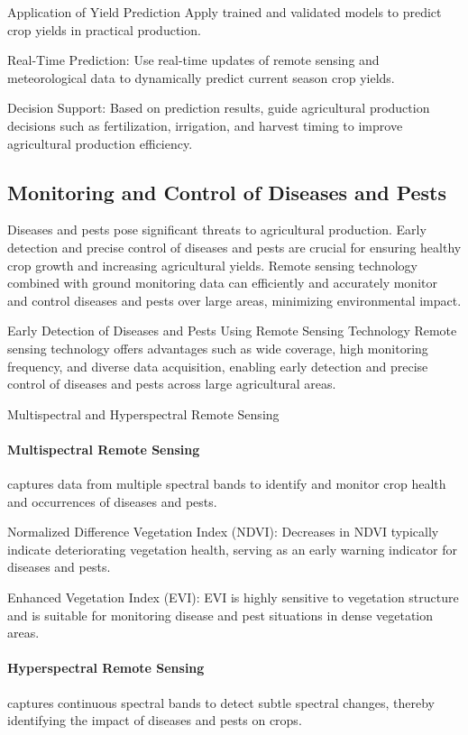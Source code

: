 Application of Yield Prediction
Apply trained and validated models to predict crop yields in practical production.

Real-Time Prediction: Use real-time updates of remote sensing and meteorological data to dynamically predict current season crop yields.

Decision Support: Based on prediction results, guide agricultural production decisions such as fertilization, irrigation, and harvest timing to improve agricultural production efficiency.

\subsection{Monitoring and Control of Diseases and Pests}
Diseases and pests pose significant threats to agricultural production. Early detection and precise control of diseases and pests are crucial for ensuring healthy crop growth and increasing agricultural yields. Remote sensing technology combined with ground monitoring data can efficiently and accurately monitor and control diseases and pests over large areas, minimizing environmental impact.

Early Detection of Diseases and Pests Using Remote Sensing Technology
Remote sensing technology offers advantages such as wide coverage, high monitoring frequency, and diverse data acquisition, enabling early detection and precise control of diseases and pests across large agricultural areas.

Multispectral and Hyperspectral Remote Sensing
\paragraph*{Multispectral Remote Sensing} captures data from multiple spectral bands to identify and monitor crop health and occurrences of diseases and pests.

Normalized Difference Vegetation Index (NDVI): Decreases in NDVI typically indicate deteriorating vegetation health, serving as an early warning indicator for diseases and pests.

Enhanced Vegetation Index (EVI): EVI is highly sensitive to vegetation structure and is suitable for monitoring disease and pest situations in dense vegetation areas.

\paragraph*{Hyperspectral Remote Sensing} captures continuous spectral bands to detect subtle spectral changes, thereby identifying the impact of diseases and pests on crops.

